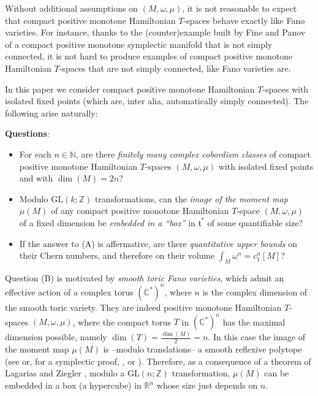 \documentclass[12pt,a4paper]{amsart}
\newcommand{\GL}{\mathrm{GL}}
\newcommand{\RR}{\mathbb{R}}
\newcommand{\CC}{\mathbb{C}}
\newcommand{\ZZ}{\mathbb{Z}}
\newcommand{\NN}{\mathbb{N}}
\theoremstyle{plain}
\theoremstyle{definition}
\begin{document}
Without additional assumptions on $(M,\omega,\mu)$, it is not reasonable to expect that compact positive monotone Hamiltonian 
$T$-spaces behave exactly like Fano varieties. For instance, thanks to the (counter)example built by Fine and Panov \cite{MR2679581} of a compact positive monotone symplectic manifold that is not simply connected, it is not hard to produce examples of compact positive monotone Hamiltonian 
$T$-spaces that are not simply connected, like Fano varieties are. 

In this paper we consider 
compact positive monotone Hamiltonian $T$-spaces with isolated fixed points (which are, inter alia, automatically simply connected).
The following arise naturally: 

\vspace{0.5cm}
\textbf{Questions}:
\begin{itemize}
\item[(A)] For each $n\in \NN$, are there \emph{finitely many complex cobordism classes} of compact positive monotone Hamiltonian $T$-spaces $(M,\omega,\mu)$ with isolated fixed points and with $\dim(M)=2n$?
\item[(B)] Modulo $\GL(k;\ZZ)$ transformations, can the \emph{image of the moment map} $\mu(M)$ of any compact positive monotone Hamiltonian $T$-space
$(M,\omega,\mu)$ of a fixed dimension be \emph{embedded in a ``box''} in $\mathfrak{t}^*$ of some quantifiable size? 
\item[(C)] If the answer to (A) is affermative, are there \textit{quantitative upper bounds} on their Chern numbers, and therefore on their volume $\int_M \omega^n=c_1^n[M]$? 
\end{itemize}
Question (B) is motivated by 
\emph{smooth toric Fano varieties}, which admit an effective action of a complex torus $(\CC^*)^n$,
where $n$ is the complex dimension of the smooth toric variety. They are indeed positive
monotone Hamiltonian $T$-spaces $(M,\omega,\mu)$, where the compact torus $T$ in
$(\CC^*)^n$ has the maximal dimension possible, namely $\dim(T)=\frac{\dim(M)}{2}=n$. In
this case the image of the moment map $\mu(M)$ is --modulo translations-- a smooth
reflexive polytope (see \cite{MR1269718} or, for a symplectic proof, 
\cite[Prop.\ 1.8]{MR2507748}, \cite[Section 3]{MR2768658} or
\cite[Prop.\ 3.10]{MR3695881}). Therefore, as a consequence of a theorem of Lagarias and Ziegler
\cite{MR1138580}, modulo a $\GL(n;\ZZ)$ transformation, $\mu(M)$ can be embedded in a box (a
hypercube) in $\RR^n$ whose size just depends on $n$.  
\end{document}
